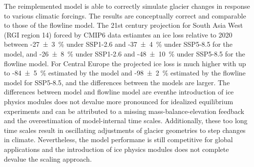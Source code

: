 The reimplemented \vas{} model is able to correctly simulate glacier changes in response to various climatic forcings. The results are conceptually correct and comparable to those of the flowline model. The 21st century projection for South Asia West (RGI region 14) forced by CMIP6 data estiamtes an ice loss relative to 2020 between -27\SI{\pm3}{\percent} under SSP1-2.6 and -37\SI{\pm4}{\percent} under SSP5-8.5 for the \vas{} model, and -26\SI{\pm8}{\percent} under SSP1-2.6 and -48\SI{\pm10}{\percent} under SSP5-8.5 for the flowline model. For Central Europe the projected ice loss is much higher with up to -84\SI{\pm5}{\percent} estimated by the \vas{} model and -98\SI{\pm2}{\percent} estimated by the flowline model for SSP5-8.5, and the differences between the models are larger. The differences between \vas{} model and flowline model are eventhe introduction of ice physics modules does not devalue more pronounced for idealized equilibrium experiments and can be attributed to a missing mass-balance-elevation feedback and the overestimation of model-internal time scales. Additionally, these too long time scales result in oscillating adjustments of glacier geometries to step changes in climate. Nevertheless, the \vas{} model performane is still competitive for global applications and the introduction of ice physics modules does not complete devalue the scaling approach.

